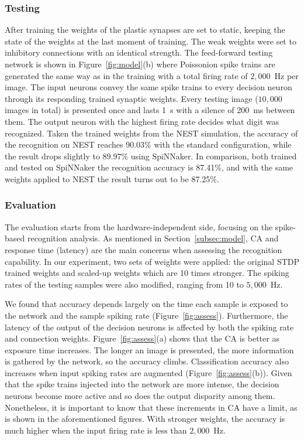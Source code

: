 \documentclass{frontiersENG} %
\begin{document}
\subsubsection{Testing}
After training the weights of the plastic synapses are set to static, keeping the state of the weights at the last moment of training.
The weak weights were set to inhibitory connections with an identical strength.
The feed-forward testing network is shown in Figure~\ref{fig:model}(b) where Poissonion spike trains are generated the same way as in the training with a total firing rate of $2,000$~Hz per image.
The input neurons convey the same spike trains to every decision neuron through its responding trained synaptic weights. 
Every testing image ($10,000$ images in total) is presented once and lasts 1~s with a silence of 200~ms between them.
The output neuron with the highest firing rate decides what digit was recognized.
Taken the trained weights from the NEST simulation, the accuracy of the recognition on NEST reaches 90.03\% with the standard configuration, while the result drops slightly to 89.97\% using SpiNNaker.
In comparison, both trained and tested on SpiNNaker the recognition accuracy is 87.41\%, and with the same weights applied to NEST the result turns out to be 87.25\%. 

\subsubsection{Evaluation}
The evaluation starts from the hardware-independent side, focusing on the spike-based recognition analysis.
As mentioned in Section~\ref{subsec:model}, CA and response time (latency) are the main concerns when assessing the recognition capability.
In our experiment, two sets of weights were applied: the original STDP trained weights and scaled-up weights which are 10 times stronger.
The spiking rates of the testing samples were also modified, ranging from 10 to $5,000$~Hz.

We found that accuracy depends largely on the time each sample is exposed to the network and the sample spiking rate (Figure~\ref{fig:assess}).
Furthermore, the latency of the output of the decision neurons is affected by both the spiking rate and connection weights.
Figure~\ref{fig:assess}(a) shows that the CA is better as exposure time increases. The longer an image is presented, the more information is gathered by the network, so the accuracy climbs.
Classification accuracy also increases when input spiking rates are augmented (Figure~\ref{fig:assess}(b)).
Given that the spike trains injected into the network are more intense, the decision neurons become more active and so does the output disparity among them.
Nonetheless, it is important to know that these increments in CA have a limit, as is shown in the aforementioned figures.
With stronger weights, the accuracy is much higher when the input firing rate is less than $2,000$~Hz.
\end{document}
